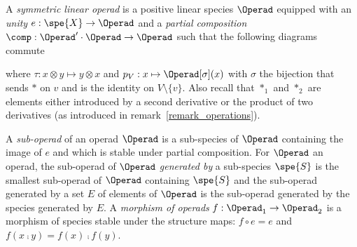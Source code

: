 \begin{defi}
    A {\em symmetric linear operad} is a positive linear species $\Operad$ equipped with an {\em unity} 
    $e: \spe{X}\to \Operad$ and a  {\em partial composition} $\comp:\Operad'\cdot\Operad\to \Operad$ such
    that the following diagrams commute
    \begin{center}\label{def_op}
    \end{center}
    \begin{center}
    \end{center}
    where  $\tau:x\otimes y\mapsto y\otimes x$ and $p_V: x \mapsto \Operad[\sigma](x)$ with $\sigma$ the
    bijection that sends $\ast$ on $v$ and is the identity on $V\setminus\{v\}$. Also recall that $\ast_1$ and 
    $\ast_2$ are elements either introduced by a second derivative or the product of two derivatives (as introduced 
    in remark~\ref{remark_operations}).
\end{defi}


A {\em sub-operad} of an operad $\Operad$ is a sub-species of $\Operad$ containing the image of $e$ and 
which is stable under partial composition. For $\Operad$ an operad, the sub-operad of $\Operad$ 
{\em generated by} a sub-species $\spe{S}$ is the smallest sub-operad of $\Operad$ containing $\spe{S}$ and 
the sub-operad generated by a set $E$ of elements of $\Operad$ is the sub-operad generated by the species 
generated by $E$. A {\em morphism of operads} $f:\Operad_1\to\Operad_2$ is a morphism of species stable
under the structure maps: $f\circ e = e$ and $f(x\comp y) =f(x)\comp f(y)$.

